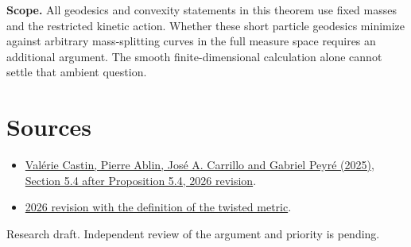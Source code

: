 \documentclass[10pt]{article}
\begin{document}
\textbf{Scope.} All geodesics and convexity statements in this theorem use fixed masses and the restricted kinetic action. Whether these short particle geodesics minimize against arbitrary mass-splitting curves in the full measure space requires an additional argument. The smooth finite-dimensional calculation alone cannot settle that ambient question.

\section*{Sources}
\begin{itemize}
\item \href{https://arxiv.org/abs/2501.18322}{Valérie Castin, Pierre Ablin, José A. Carrillo and Gabriel Peyré (2025), Section 5.4 after Proposition 5.4, 2026 revision}.
\item \href{https://arxiv.org/html/2501.18322v2}{2026 revision with the definition of the twisted metric}.
\end{itemize}
{\small Research draft. Independent review of the argument and priority is pending.}
\end{document}

